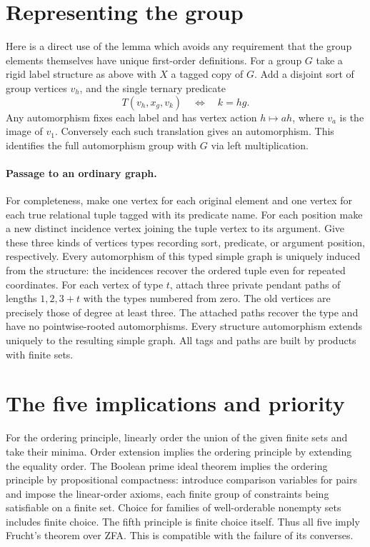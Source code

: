 \documentclass[11pt]{article}
\begin{document}
\section{Representing the group}
Here is a direct use of the lemma which avoids any requirement that the group elements themselves have unique first-order definitions. For a group $G$ take a rigid label structure as above with $X$ a tagged copy of $G$. Add a disjoint sort of group vertices $v_h$, and the single ternary predicate
\[
T(v_h,x_g,v_k)\quad\Longleftrightarrow\quad k=hg.
\]
Any automorphism fixes each label and has vertex action $h\mapsto ah$, where $v_a$ is the image of $v_1$. Conversely each such translation gives an automorphism. This identifies the full automorphism group with $G$ via left multiplication.
\paragraph{Passage to an ordinary graph.} For completeness, make one vertex for each original element and one vertex for each true relational tuple tagged with its predicate name. For each position make a new distinct incidence vertex joining the tuple vertex to its argument. Give these three kinds of vertices types recording sort, predicate, or argument position, respectively. Every automorphism of this typed simple graph is uniquely induced from the structure: the incidences recover the ordered tuple even for repeated coordinates. For each vertex of type $t$, attach three private pendant paths of lengths $1,2,3+t$ with the types numbered from zero. The old vertices are precisely those of degree at least three. The attached paths recover the type and have no pointwise-rooted automorphisms. Every structure automorphism extends uniquely to the resulting simple graph. All tags and paths are built by products with finite sets.
\section{The five implications and priority}
For the ordering principle, linearly order the union of the given finite sets and take their minima. Order extension implies the ordering principle by extending the equality order. The Boolean prime ideal theorem implies the ordering principle by propositional compactness: introduce comparison variables for pairs and impose the linear-order axioms, each finite group of constraints being satisfiable on a finite set. Choice for families of well-orderable nonempty sets includes finite choice. The fifth principle is finite choice itself. Thus all five imply Frucht's theorem over ZFA. This is compatible with the failure of its converses.
\end{document}
